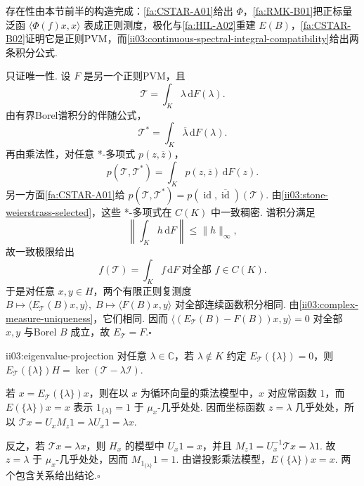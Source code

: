 \begin{FAProof}
存在性由本节前半的构造完成：\autoref{fa:CSTAR-A01}给出 \(\displaystyle\Phi\)，\autoref{fa:RMK-B01}把正标量泛函 \(\displaystyle\langle\Phi(f)x,x\rangle\) 表成正则测度，极化与\autoref{fa:HIL-A02}重建 \(\displaystyle E(B)\)，\autoref{fa:CSTAR-B02}证明它是正则PVM，而\autoref{ii03:continuous-spectral-integral-compatibility}给出两条积分公式.

只证唯一性. 设 \(\displaystyle F\) 是另一个正则PVM，且
\[
\mathcal T=\int_K\lambda\,\mathrm{d}F(\lambda).
\]
由有界Borel谱积分的伴随公式，
\[
\mathcal T^*=\int_K\overline\lambda\,\mathrm{d}F(\lambda).
\]
再由乘法性，对任意 *-多项式 \(\displaystyle p(z,\overline z)\)，
\[
p(\mathcal T,\mathcal T^*)
=\int_Kp(z,\overline z)\,\mathrm{d}F(z).
\]
另一方面\autoref{fa:CSTAR-A01}给
\(\displaystyle p(\mathcal T,\mathcal T^*)=p(\operatorname{id},\overline{\operatorname{id}})(\mathcal T).\)
由\autoref{ii03:stone-weierstrass-selected}，这些 *-多项式在 \(\displaystyle C(K)\) 中一致稠密. 谱积分满足
\[
\left\|\int_K h\,\mathrm{d}F\right\|\leqslant\|h\|_\infty,
\]
故一致极限给出
\[
f(\mathcal T)=\int_Kf\,\mathrm{d}F
\;\text{对全部 }f\in C(K).
\]
于是对任意 \(\displaystyle x,y\in H\)，两个有限正则复测度
\(\displaystyle B\longmapsto\langle E_{\mathcal T}(B)x,y\rangle, \; B\longmapsto\langle F(B)x,y\rangle\)
对全部连续函数积分相同. 由\autoref{ii03:complex-measure-uniqueness}，它们相同. 因而
\(\displaystyle \langle(E_{\mathcal T}(B)-F(B))x,y\rangle=0\)
对全部 \(\displaystyle x,y\) 与Borel \(\displaystyle B\) 成立，故 \(\displaystyle E_{\mathcal T}=F\).\hfill\(\square\)
\end{FAProof}

\begin{FAProposition}[B][谱原子等于特征空间投影]{ii03:eigenvalue-projection}
对任意 \(\displaystyle\lambda\in\mathbb C\)，若 \(\displaystyle\lambda\notin K\) 约定 \(\displaystyle E_{\mathcal T}(\{\lambda\})=0\)，则
\(\displaystyle E_{\mathcal T}(\{\lambda\})H = \ker(\mathcal T-\lambda\mathcal I).\)
\end{FAProposition}

\begin{FAProof}
若 \(\displaystyle x=E_{\mathcal T}(\{\lambda\})x\)，则在以 \(\displaystyle x\) 为循环向量的乘法模型中，\(\displaystyle x\) 对应常函数 \(\displaystyle1\)，而 \(\displaystyle E(\{\lambda\})x=x\) 表示 \(\displaystyle1_{\{\lambda\}}=1\) 于 \(\displaystyle\mu_x\)-几乎处处. 因而坐标函数 \(\displaystyle z=\lambda\) 几乎处处，所以
\(\displaystyle \mathcal T x =U_xM_z1 =\lambda U_x1 =\lambda x.\)

反之，若 \(\displaystyle\mathcal T x=\lambda x\)，则 \(\displaystyle H_x\) 的模型中 \(\displaystyle U_x1=x\)，并且
\(\displaystyle M_z1=U_x^{-1}\mathcal T x=\lambda1.\)
故 \(\displaystyle z=\lambda\) 于 \(\displaystyle\mu_x\)-几乎处处，因而 \(\displaystyle M_{1_{\{\lambda\}}}1=1\). 由谱投影乘法模型，\(\displaystyle E(\{\lambda\})x=x\). 两个包含关系给出结论.\hfill\(\square\)
\end{FAProof}


